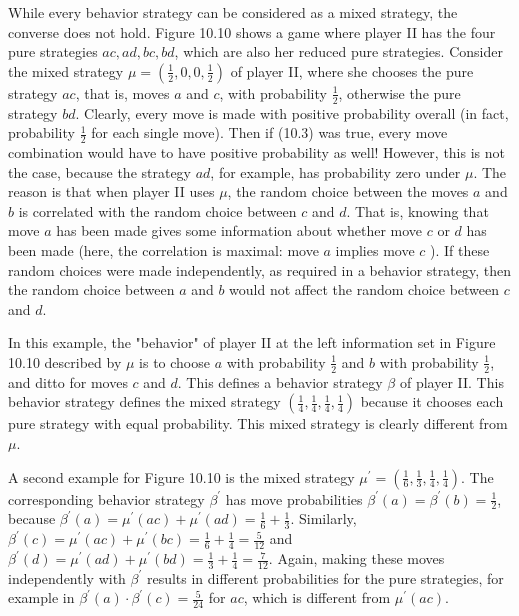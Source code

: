 \documentclass[12pt]{article}
\begin{document}
While every behavior strategy can be considered as a mixed strategy, the converse does not hold. Figure 10.10 shows a game where player II has the four pure strategies $a c, a d, b c, b d$, which are also her reduced pure strategies. Consider the mixed strategy $\mu=\left(\frac{1}{2}, 0,0, \frac{1}{2}\right)$ of player II, where she chooses the pure strategy $a c$, that is, moves $a$ and $c$, with probability $\frac{1}{2}$, otherwise the pure strategy $b d$. Clearly, every move is made with positive probability overall (in fact, probability $\frac{1}{2}$ for each single move). Then if (10.3) was true, every move combination would have to have positive probability as well! However, this is not the case, because the strategy $a d$, for example, has probability zero under $\mu$. The reason is that when player II uses $\mu$, the random choice between the moves $a$ and $b$ is correlated with the random choice between $c$ and $d$. That is, knowing that move $a$ has been made gives some information about whether move $c$ or $d$ has been made (here, the correlation is maximal: move $a$ implies move $c$ ). If these random choices were made independently, as required in a behavior strategy, then the random choice between $a$ and $b$ would not affect the random choice between $c$ and $d$.

In this example, the "behavior" of player II at the left information set in Figure 10.10 described by $\mu$ is to choose $a$ with probability $\frac{1}{2}$ and $b$ with probability $\frac{1}{2}$, and ditto for moves $c$ and $d$. This defines a behavior strategy $\beta$ of player II. This behavior strategy defines the mixed strategy $\left(\frac{1}{4}, \frac{1}{4}, \frac{1}{4}, \frac{1}{4}\right)$ because it chooses each pure strategy with equal probability. This mixed strategy is clearly different from $\mu$.

A second example for Figure 10.10 is the mixed strategy $\mu^{\prime}=\left(\frac{1}{6}, \frac{1}{3}, \frac{1}{4}, \frac{1}{4}\right)$. The corresponding behavior strategy $\beta^{\prime}$ has move probabilities $\beta^{\prime}(a)=\beta^{\prime}(b)=\frac{1}{2}$, because $\beta^{\prime}(a)=\mu^{\prime}(a c)+\mu^{\prime}(a d)=\frac{1}{6}+\frac{1}{3}$. Similarly, $\beta^{\prime}(c)=\mu^{\prime}(a c)+\mu^{\prime}(b c)=\frac{1}{6}+\frac{1}{4}=\frac{5}{12}$ and $\beta^{\prime}(d)=\mu^{\prime}(a d)+\mu^{\prime}(b d)=\frac{1}{3}+\frac{1}{4}=\frac{7}{12}$. Again, making these moves independently with $\beta^{\prime}$ results in different probabilities for the pure strategies, for example in $\beta^{\prime}(a) \cdot \beta^{\prime}(c)=\frac{5}{24}$ for $a c$, which is different from $\mu^{\prime}(a c)$.
\end{document}

